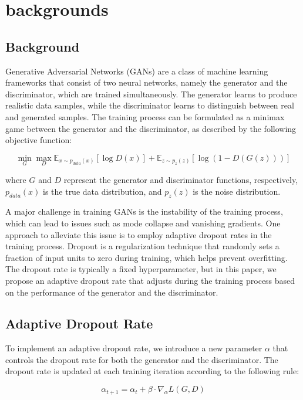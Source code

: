 \section{backgrounds}

\subsection{Background}
Generative Adversarial Networks (GANs) are a class of machine learning frameworks that consist of two neural networks, namely the generator and the discriminator, which are trained simultaneously. The generator learns to produce realistic data samples, while the discriminator learns to distinguish between real and generated samples. The training process can be formulated as a minimax game between the generator and the discriminator, as described by the following objective function:

\begin{equation}
\min_{G} \max_{D} \mathbb{E}_{x \sim p_{data}(x)}[\log D(x)] + \mathbb{E}_{z \sim p_{z}(z)}[\log (1 - D(G(z)))]
\end{equation}

where $G$ and $D$ represent the generator and discriminator functions, respectively, $p_{data}(x)$ is the true data distribution, and $p_{z}(z)$ is the noise distribution.

A major challenge in training GANs is the instability of the training process, which can lead to issues such as mode collapse and vanishing gradients. One approach to alleviate this issue is to employ adaptive dropout rates in the training process. Dropout is a regularization technique that randomly sets a fraction of input units to zero during training, which helps prevent overfitting. The dropout rate is typically a fixed hyperparameter, but in this paper, we propose an adaptive dropout rate that adjusts during the training process based on the performance of the generator and the discriminator.

\subsection{Adaptive Dropout Rate}
To implement an adaptive dropout rate, we introduce a new parameter $\alpha$ that controls the dropout rate for both the generator and the discriminator. The dropout rate is updated at each training iteration according to the following rule:

\begin{equation}
\alpha_{t+1} = \alpha_t + \beta \cdot \nabla_\alpha L(G, D)
\end{equation}

